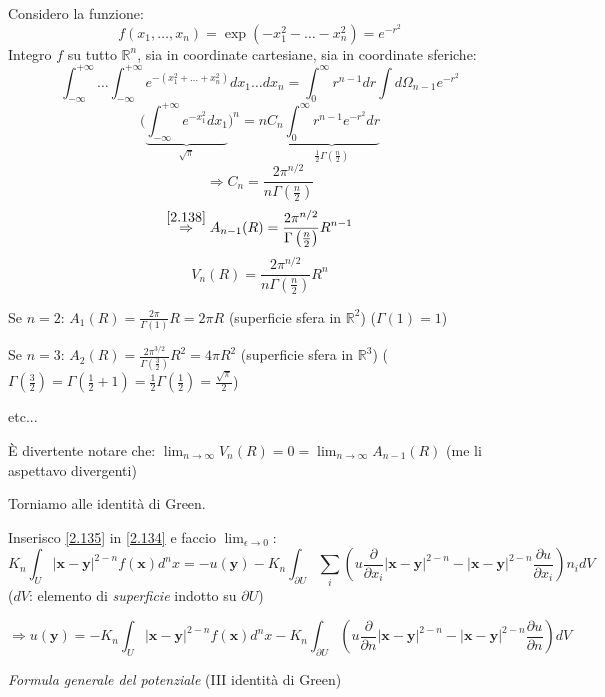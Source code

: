 \documentclass[a4paper,11pt]{report}
\newcommand{\R}{\mathbb{R}}
\newcommand{\Rn}{\mathbb{R}^n}
\newcommand{\x}{\boldsymbol{x}}
\newcommand{\y}{\boldsymbol{y}}
\begin{document}
Considero la funzione:
\[
f(x_1,\ldots,x_n)=\exp(-x_1^2 - \ldots - x_n^2)=e^{-r^2}
\]
Integro $f$ su tutto $\Rn$, sia in coordinate cartesiane, sia in coordinate sferiche:
\[
\int_{-\infty}^{+\infty} \ldots \int_{-\infty}^{+\infty} e^{-(x_1^2 + \ldots + x_n^2)}dx_1 \ldots dx_n = \int_0^{\infty}r^{n-1}dr\int d\Omega_{n-1}e^{-r^2}
\]
\[
\Big( \underbrace{\int_{-\infty}^{+\infty}e^{-x_1^2}dx_1}_{\sqrt{\pi}} \Big)^n = n C_n \underbrace{\int_0^\infty r^{n-1}e^{-r^2}dr}_{\frac{1}{2}\Gamma(\frac{n}{2}) }
\]
\[
\Rightarrow C_n = \frac{2\pi^{n/2}}{n\Gamma\left(\frac{n}{2}\right)}
\]
\begin{equation}
\overset{\eqref{2.138}}{\Rightarrow}A_{n-1}(R) = \frac{2\pi^{n/2}}{\Gamma\left(\frac{n}{2}\right)}R^{n-1}
\label{2.142}
\end{equation}
\begin{equation}
V_n(R)=\frac{2\pi^{n/2}}{n\Gamma\left(\frac{n}{2}\right)}R^n 
\label{2.143}
\end{equation}

Se $n=2$: $A_1(R)=\frac{2\pi}{\Gamma(1)} R=2\pi R$ (superficie sfera in $\R^2$) ($\Gamma(1)=1$)

Se $n=3$: $A_2(R)=\frac{2\pi^{3/2}}{\Gamma\left(\frac{3}{2}\right)}R^2=4\pi R^2$ (superficie sfera in $\R^3$) ($\Gamma(\frac{3}{2})=\Gamma(\frac{1}{2}+1)=\frac{1}{2}\Gamma(\frac{1}{2})=\frac{\sqrt{\pi}}{2}$)

etc...

\`E divertente notare che: $\lim_{n\to \infty} V_n(R)=0=\lim_{n\to \infty}A_{n-1}(R)$ (me li aspettavo divergenti)

\medskip

Torniamo alle identit\`a di Green.

Inserisco \eqref{2.135} in \eqref{2.134} e faccio $\lim_{\epsilon\to 0}$:
\[
K_n\int_U |\x - \y|^{2-n}f(\x)d^nx=-u(\y) - K_n\int_{\partial U}\sum_i \left(u\frac{\partial}{\partial x_i}|\x - \y|^{2-n} - |\x - \y|^{2-n} \frac{\partial u}{\partial x_i} \right)n_i dV
\]
($dV$: elemento di \emph{superficie} indotto su $\partial U$)

\begin{equation}
\Rightarrow u(\y)=-K_n\int_U |\x - \y|^{2-n}f(\x) d^n x - K_n\int_{\partial U} \left(u\frac{\partial}{\partial n}|\x - \y|^{2-n} - |\x - \y|^{2-n} \frac{\partial u}{\partial n} \right)dV
\label{2.144}
\end{equation}
\centerline{\emph{Formula generale del potenziale} (III identit\`a di Green)}

\medskip
\end{document}
